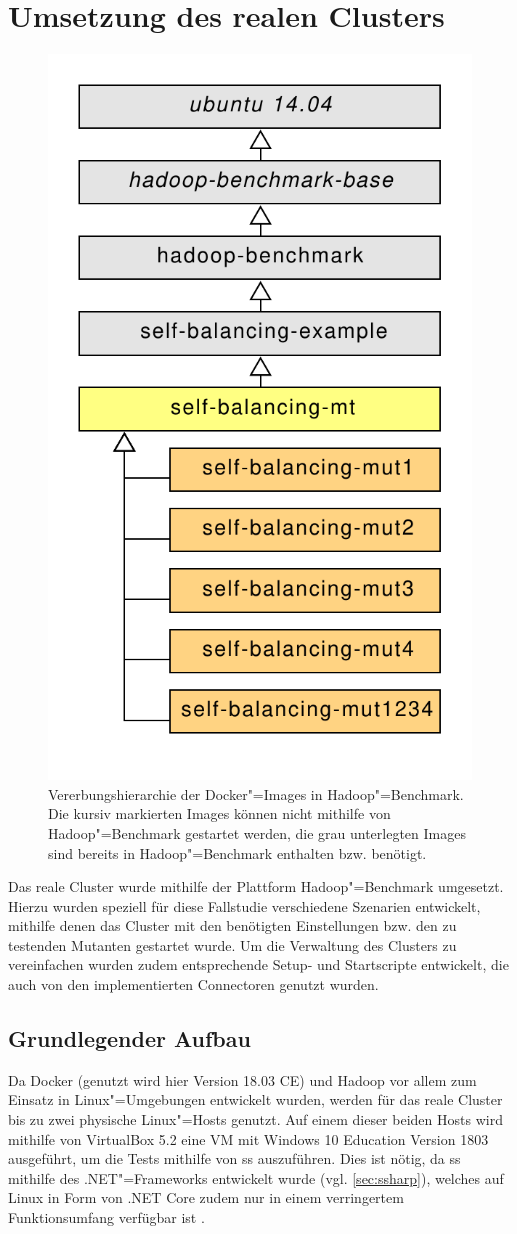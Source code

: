 \section{Umsetzung des realen Clusters}
\label{sec:realCluster}

\begin{figure}
    \includegraphics[width=0.4\columnwidth]
    {./resources/hadoopBenchDockerInherits.pdf}
    \caption[Vererbungshierarchie der Docker"=Images in Hadoop"=Benchmark]
    {Vererbungshierarchie der Docker"=Images in Hadoop"=Benchmark.
    Die kursiv markierten Images können nicht mithilfe von Hadoop"=Benchmark gestartet werden, die grau unterlegten Images sind bereits in Hadoop"=Benchmark enthalten bzw. benötigt.}
    \label{fig:hadoopBenchDockerInherits}
\end{figure}

Das reale Cluster wurde mithilfe der Plattform Hadoop"=Benchmark umgesetzt.
Hierzu wurden speziell für diese Fallstudie verschiedene Szenarien entwickelt, mithilfe denen das Cluster mit den benötigten Einstellungen bzw. den zu testenden Mutanten gestartet wurde.
Um die Verwaltung des Clusters zu vereinfachen wurden zudem entsprechende Setup- und Startscripte entwickelt, die auch von den implementierten Connectoren genutzt wurden.

\subsection{Grundlegender Aufbau}
\label{subsec:clusterBasics}

Da Docker (genutzt wird hier Version 18.03 CE) und Hadoop vor allem zum Einsatz in Linux"=Umgebungen entwickelt wurden, werden für das reale Cluster bis zu zwei physische Linux"=Hosts genutzt.
Auf einem dieser beiden Hosts wird mithilfe von VirtualBox 5.2 eine VM mit Windows 10 Education Version 1803 ausgeführt, um die Tests mithilfe von \gls{ss} auszuführen.
Dies ist nötig, da \gls{ss} mithilfe des .NET"=Frameworks entwickelt wurde (vgl. \cref{sec:ssharp}), welches auf Linux in Form von .NET Core zudem nur in einem verringertem Funktionsumfang verfügbar ist \cite{Schwichtenberg2017}.


